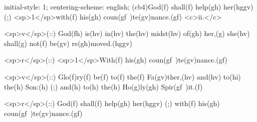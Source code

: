 initial-style: 1;
centering-scheme: english;
(cb4)God(f) shall(f) help(gh) her(hggv) (;) <sp>1</sp>with(f) his(gh) coun(gf~)te(gv)nance.(gf) <c>ii.</c>

<sp>v</sp>(::) God(fh) is(hv) in(hv) the(hv) midst(hv) of(gh) her,(g) she(hv) shall(g) not(f) be(gv) re(gh)moved.(hggv)

<sp>r</sp>(::) <sp>1</sp>With(f) his(gh) coun(gf~)te(gv)nance.(gf)

<sp>v</sp>(::) Glo(f)ry(f) be(f) to(f) the(f) Fa(gv)ther,(hv) and(hv) to(hi) the(h) Son:(h) (;) and(h) to(h) the(h) Ho(g)ly(gh) Spir(gf~)it.(f)

<sp>r</sp>(::) God(f) shall(f) help(gh) her(hggv) (;) with(f) his(gh) coun(gf~)te(gv)nance.(gf)